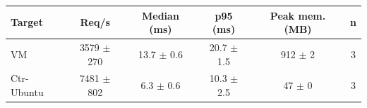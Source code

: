 \begin{tabular}{|l|c|c|c|c|c|}
\hline
\textbf{Target} & \textbf{Req/s} & \textbf{Median (ms)} & \textbf{p95 (ms)} & \textbf{Peak mem. (MB)} & \textbf{n} \\
\hline
VM & 3579 $\pm$ 270 & 13.7 $\pm$ 0.6 & 20.7 $\pm$ 1.5 & 912 $\pm$ 2 & 3 \\
\hline
Ctr-Ubuntu & 7481 $\pm$ 802 & 6.3 $\pm$ 0.6 & 10.3 $\pm$ 2.5 & 47 $\pm$ 0 & 3 \\
\hline
\end{tabular}
